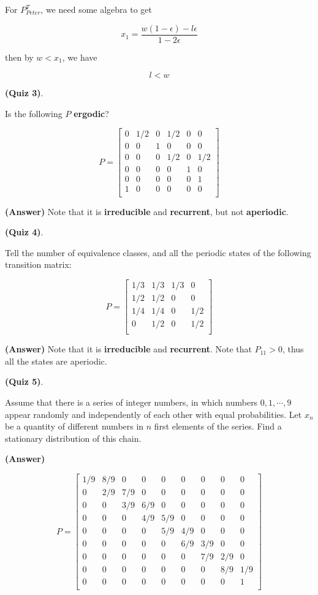 \documentclass[12pt]{article}
\theoremstyle{nonumberbreak}
\begin{document}
For $P_{Peter}^T$, we need some algebra to get

$$
x_1 = \frac{w(1-\epsilon) - l\epsilon}{1-2\epsilon}
$$

then by $w < x_1$, we have

$$
l < w
$$



\textbf{(Quiz 3)}. 

Is the following $P$ \textbf{ergodic}?

$$
P = \begin{bmatrix}
0 & 1/2 & 0 & 1/2 & 0 & 0 \\
0 & 0 & 1 & 0 & 0 & 0 \\
0 & 0 & 0 & 1/2 & 0 & 1/2 \\
0 & 0 & 0 & 0 & 1 & 0 \\
0 & 0 & 0 & 0 & 0 & 1 \\
1 & 0 & 0 & 0 & 0 & 0 \\
\end{bmatrix}
$$


\textbf{(Answer)} Note that it is \textbf{irreducible} and \textbf{recurrent}, but not \textbf{aperiodic}.


\textbf{(Quiz 4)}. 

Tell the number of equivalence classes, and all the periodic states of the following transition matrix:

$$
P = \begin{bmatrix}
1/3 & 1/3 & 1/3 & 0 \\
1/2 & 1/2 & 0 & 0 \\
1/4 & 1/4 & 0 & 1/2 \\
0 & 1/2 & 0 & 1/2 \\
\end{bmatrix}
$$

\textbf{(Answer)} Note that it is \textbf{irreducible} and \textbf{recurrent}. Note that $P_{11} > 0$, thus all the states are aperiodic. 


\textbf{(Quiz 5)}. 

Assume that there is a series of integer numbers, in which numbers $0,1,\cdots, 9$ appear randomly and independently of each other with equal probabilities. Let $x_n$ be a quantity of different numbers in $n$ first elements of the series. Find a stationary distribution of this chain.

\textbf{(Answer)}

$$
P = \begin{bmatrix}
1/9 & 8/9 & 0 & 0 & 0 & 0 & 0 & 0 & 0 \\
0 & 2/9 & 7/9 & 0 & 0 & 0 & 0 & 0 & 0 \\
0 & 0 & 3/9 & 6/9 & 0 & 0 & 0 & 0 & 0 \\
0 & 0 & 0 & 4/9 & 5/9 & 0 & 0 & 0 & 0 \\
0 & 0 & 0 & 0 & 5/9 & 4/9 & 0 & 0 & 0 \\
0 & 0 & 0 & 0 & 0 & 6/9 & 3/9 & 0 & 0 \\
0 & 0 & 0 & 0 & 0 & 0 & 7/9 & 2/9 & 0 \\
0 & 0 & 0 & 0 & 0 & 0 & 0 & 8/9 & 1/9 \\
0 & 0 & 0 & 0 & 0 & 0 & 0 & 0 & 1 \\
\end{bmatrix}
$$
\end{document}
